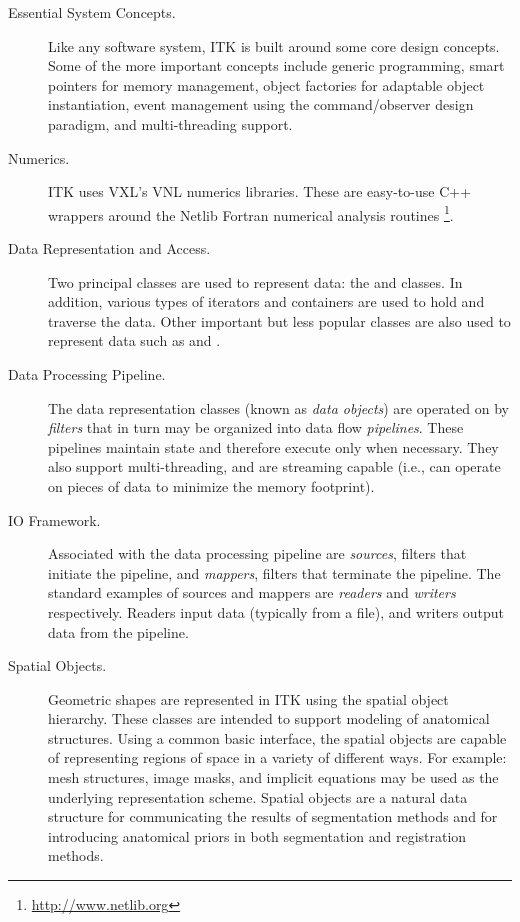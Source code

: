 \begin{description}
  \item[Essential System Concepts.] Like any software system, ITK is
        built around some core design concepts. Some of the more important
        concepts include generic programming, smart pointers for memory
        management, object factories for adaptable object instantiation,
        event management using the command/observer design paradigm, and
        multi-threading support.

  \item[Numerics.] ITK uses VXL's VNL numerics libraries. These are
        easy-to-use C++ wrappers around the Netlib Fortran numerical
        analysis routines \footnote{\url{http://www.netlib.org}}.

  \item[Data Representation and Access.] Two principal classes are
        used to represent data: the  and 
        classes. In addition, various types of iterators and containers are
        used to hold and traverse the data. Other important but less popular
        classes are also used to represent data such as  and
        .

  \item[Data Processing Pipeline.] The data representation
    classes (known as \emph{data objects}) are operated on by
    \emph{filters} that in turn may be organized into data flow
    \emph{pipelines}. These pipelines maintain state and therefore
    execute only when necessary.  They also support
    multi-threading, and are streaming capable (i.e., can operate
    on pieces of data to minimize the memory footprint).

    \item[IO Framework.] Associated with the data processing
        pipeline are \emph{sources}, filters that initiate the
        pipeline, and \emph{mappers}, filters that terminate the
        pipeline.  The standard examples of sources and mappers are
        \emph{readers} and \emph{writers} respectively. Readers
        input data (typically from a file), and writers output data
        from the pipeline.

  \item[Spatial Objects.] Geometric shapes are represented in ITK using
        the spatial object hierarchy. These classes are intended to support
        modeling of anatomical structures. Using a common basic interface,
        the spatial objects are capable of representing regions of space in a
        variety of different ways. For example: mesh structures, image masks,
        and implicit equations may be used as the underlying representation
        scheme. Spatial objects are a natural data structure for
        communicating the results of segmentation methods and for introducing
        anatomical priors in both segmentation and registration methods.


\end{description}
